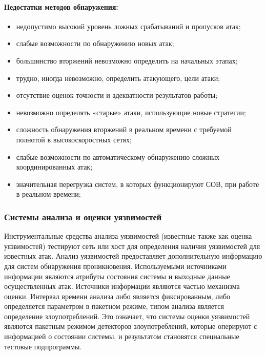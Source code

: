 \paragraph*{Недостатки методов обнаружения:}

\begin{itemize}
	\item недопустимо высокий уровень ложных срабатываний и пропусков атак;
	\item слабые возможности по обнаружению новых атак;
	\item большинство вторжений невозможно определить на начальных этапах;
	\item трудно, иногда невозможно, определить атакующего, цели атаки;
	\item отсутствие оценок точности и адекватности результатов работы;
	\item невозможно определять «старые» атаки, использующие новые стратегии;
	\item сложность обнаружения вторжений в реальном времени с требуемой полнотой в высокоскоростных сетях;
	\item слабые возможности по автоматическому обнаружению сложных координированных атак;
	\item значительная перегрузка систем, в которых функционируют СОВ, при работе в реальном времени;
	
\end{itemize}



\subsubsection{Системы анализа и оценки уязвимостей}


Инструментальные средства анализа уязвимостей (известные также как оценка уязвимостей) тестируют сеть или хост для определения наличия уязвимостей для известных атак. Анализ уязвимостей предоставляет дополнительную информацию для систем обнаружения проникновения. Используемыми источниками информации являются атрибуты состояния системы и выходные данные осуществленных атак. Источники информации являются частью механизма оценки. Интервал времени анализа либо является фиксированным, либо определяется параметром в пакетном режиме, типом анализа является определение злоупотреблений. Это означает, что системы оценки уязвимостей являются пакетным режимом детекторов злоупотреблений, которые оперируют с информацией о состоянии системы, и результатом становятся специальные тестовые подпрограммы. \autocite{IntrusionDetectionSystemsMsu}

